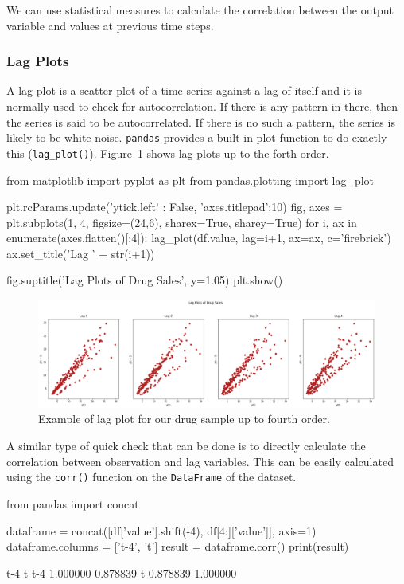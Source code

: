 We can use statistical measures to calculate the correlation between the output variable and values at previous time steps. 

\subsubsection{Lag Plots}\label{lag-plots}

A lag plot is a scatter plot of a time series against a lag of itself and it is normally used to check for autocorrelation. If there is any pattern in there, then the series is said to be autocorrelated. If there is no such a pattern, the series is likely to be white noise.
\texttt{pandas} provides a built-in plot function to do exactly this (\texttt{lag\_plot()}). Figure~\ref{fig:lag_plot} shows lag plots up to the forth order.

\begin{ipython}
from matplotlib import pyplot as plt
from pandas.plotting import lag_plot

plt.rcParams.update({'ytick.left' : False, 'axes.titlepad':10})
fig, axes = plt.subplots(1, 4, figsize=(24,6), sharex=True, sharey=True)
for i, ax in enumerate(axes.flatten()[:4]):
    lag_plot(df.value, lag=i+1, ax=ax, c='firebrick')
    ax.set_title('Lag ' + str(i+1))

fig.suptitle('Lag Plots of Drug Sales', y=1.05)
plt.show()
\end{ipython}

\begin{figure}[htb]
	\centering
	\includegraphics[width=\linewidth]{figures/lag_plot.png}
	\caption{Example of lag plot for our drug sample up to fourth order.}
	\label{fig:lag_plot}
\end{figure}
    
A similar type of quick check that can be done is to directly calculate
the correlation between observation and lag variables. This
can be easily calculated using the \texttt{corr()} function
on the \texttt{DataFrame} of the dataset.

\begin{ipython}
from pandas import concat

dataframe = concat([df['value'].shift(-4), df[4:]['value']], axis=1)
dataframe.columns = ['t-4', 't']
result = dataframe.corr()
print(result)
\end{ipython}
\begin{ioutput}
          t-4         t
t-4  1.000000  0.878839
t    0.878839  1.000000
\end{ioutput}

